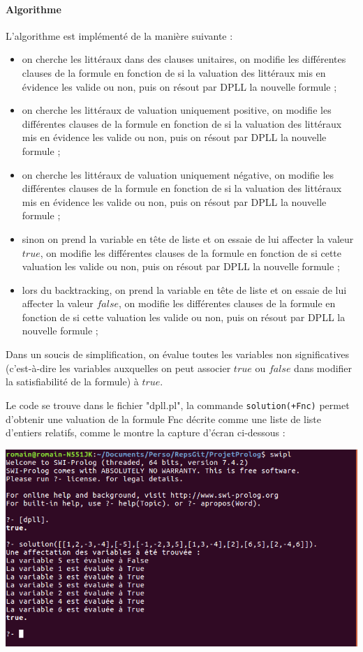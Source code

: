 \documentclass[12pt,a4paper]{article}
\begin{document}
\paragraph{Algorithme} L'algorithme est implémenté de la manière suivante :
\begin{itemize}
\item on cherche les littéraux dans des clauses unitaires, on modifie les différentes clauses de la formule en fonction de si la valuation des littéraux mis en évidence les valide ou non, puis on résout par DPLL la nouvelle formule ;
\item on cherche les littéraux de valuation uniquement positive, on modifie les différentes clauses de la formule en fonction de si la valuation des littéraux mis en évidence les valide ou non, puis on résout par DPLL la nouvelle formule ;
\item on cherche les littéraux de valuation uniquement négative, on modifie les différentes clauses de la formule en fonction de si la valuation des littéraux mis en évidence les valide ou non, puis on résout par DPLL la nouvelle formule ;
\item sinon on prend la variable en tête de liste et on essaie de lui affecter la valeur $true$, on modifie les différentes clauses de la formule en fonction de si cette valuation les valide ou non, puis on résout par DPLL la nouvelle formule ;
\item lors du backtracking, on prend la variable en tête de liste et on essaie de lui affecter la valeur $false$, on modifie les différentes clauses de la formule en fonction de si cette valuation les valide ou non, puis on résout par DPLL la nouvelle formule ;
\end{itemize}

Dans un soucis de simplification, on évalue toutes les variables non significatives (c'est-à-dire les variables auxquelles on peut associer $true$ ou $false$ dans modifier la satisfiabilité de la formule) à $true$.


Le code se trouve dans le fichier "dpll.pl", la commande \texttt{solution(+Fnc)} permet d'obtenir une valuation de la formule Fnc décrite comme une liste de liste d'entiers relatifs, comme le montre la capture d'écran ci-dessous :

\begin{center}
\includegraphics[width = 400pt]{SolutionDpll.png}
\end{center}
\end{document}
